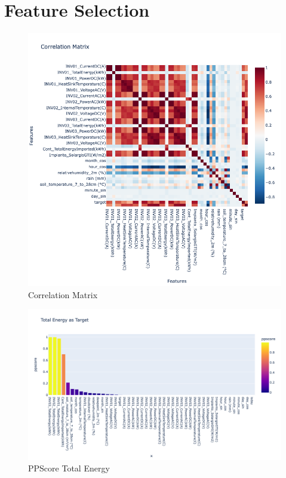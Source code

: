 \section{Feature Selection}\label{sec:featureselection}


\begin{figure}[H]
	\centering
	\includegraphics[width=\textwidth, keepaspectratio]{chapters/2_data_preprocessing/imgs/correlationmatrix.png}
	\caption{Correlation Matrix} %
	\label{fig:corrmatrix}
\end{figure}


\begin{figure}[H]
	\centering
	\includegraphics[width=\textwidth, keepaspectratio]{chapters/2_data_preprocessing/imgs/ppcontottenergy.png}
	\caption{PPScore Total Energy} %
	\label{fig:ppsTotEnergy}
\end{figure}


